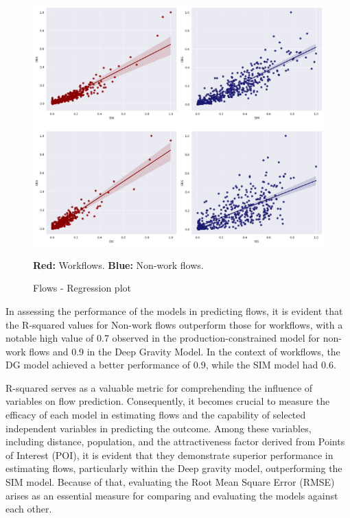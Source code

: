             \begin{figure}[H]
            \centering
            \includegraphics[width=14cm]{Images/Flows_regression.png}
            \caption{Flows - Regression plot}
            \label{fig: Flows - Regression}
            \footnotesize{\textbf{Red:} Workflows. \textbf{Blue:} Non-work flows.}
        \end{figure}

    In assessing the performance of the models in predicting flows, it is evident that the R-squared values for Non-work flows outperform those for workflows, with a notable high value of 0.7 observed in the production-constrained model for non-work flows and 0.9 in the Deep Gravity Model. In the context of workflows, the DG model achieved a better performance of 0.9, while the SIM model had 0.6.
    
    R-squared serves as a valuable metric for comprehending the influence of variables on flow prediction. Consequently, it becomes crucial to measure the efficacy of each model in estimating flows and the capability of selected independent variables in predicting the outcome. Among these variables, including distance, population, and the attractiveness factor derived from Points of Interest (POI), it is evident that they demonstrate superior performance in estimating flows, particularly within the Deep gravity model, outperforming the SIM model. Because of that, evaluating the Root Mean Square Error (RMSE) arises as an essential measure for comparing and evaluating the models against each other.

